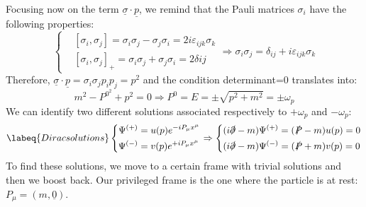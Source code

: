 \documentclass[../main.tex]{subfiles}
\begin{document}
Focusing now on the term $\underline{\sigma}\cdot\underline{p}$, we remind that the Pauli matrices $\sigma_i$ have the following properties:
\[
\left\{
\begin{aligned}
&[\sigma_i,\sigma_j]=\sigma_i\sigma_j-\sigma_j\sigma_i=2i\varepsilon_{ijk}\sigma_k\\
&[\sigma_i,\sigma_j]_+=\sigma_i\sigma_j+\sigma_j\sigma_i=2\delta{ij}
\end{aligned}
\right.
\Rightarrow \sigma_i\sigma_j=\delta_{ij}+i\varepsilon_{ijk}\sigma_k
\]
Therefore, $\underline{\sigma}\cdot\underline{p}=\sigma_i\sigma_jp_ip_j=p^2$ and the condition determinant=0 translates into:
\[
m^2-P^{0^2}+p^2=0\Rightarrow P^0=E=\pm\sqrt{p^2+m^2}=\pm\omega_p
\]
We can identify two different solutions associated respectively to $+\omega_p$ and $-\omega_p$:
\begin{equation}
\labeq{Diracsolutions}
\left\{
\begin{aligned}
\Psi^{(+)}&=u(p)e^{-iP_\mu x^\mu}\\
\Psi^{(-)}&=v(p)e^{+iP_\mu x^\mu}
\end{aligned}
\right.
\Rightarrow
\left\{
\begin{aligned}
&(i\slashed{\partial}-m)\Psi^{(+)}=(\slashed{P}-m)u(p)=0\\
&(i\slashed{\partial}-m)\Psi^{(-)}=(\slashed{P}+m)v(p)=0
\end{aligned}
\right.
\end{equation}
To find these solutions, we move to a certain frame with trivial solutions and then we boost back. Our privileged frame is the one where the particle is at rest: $P_\mu=(m,\underline{0})$.
\end{document}

